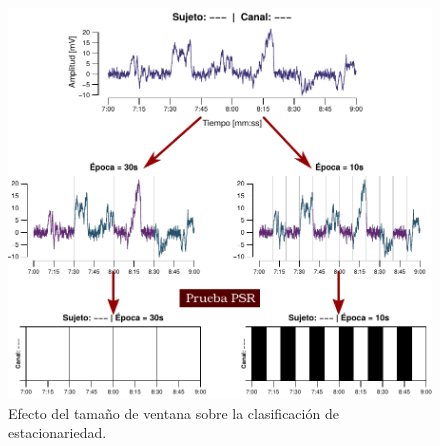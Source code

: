 \begin{figure}
\centering
\includegraphics[width=\linewidth]{./img_diagramas/epocas_diferentes_v2.pdf}
\caption{Efecto del tamaño de ventana sobre la clasificación de estacionariedad.}
\label{epocas_diferentes}
\end{figure}

